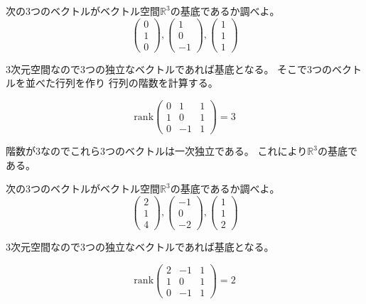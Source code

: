 \documentclass[12pt,b5paper]{ltjsarticle}
\begin{document}
次の3つのベクトルがベクトル空間$\mathbb{R}^3$の基底であるか調べよ。
\begin{equation}
 \begin{pmatrix}0\\1\\0\end{pmatrix},
 \begin{pmatrix}1\\0\\-1\end{pmatrix},
 \begin{pmatrix}1\\1\\1\end{pmatrix}
\end{equation}

\dotfill

3次元空間なので3つの独立なベクトルであれば基底となる。
そこで3つのベクトルを並べた行列を作り
行列の階数を計算する。

\begin{equation}
 \mathrm{rank}
 \begin{pmatrix}0 & 1 & 1\\1 & 0 & 1\\0 & -1 & 1\end{pmatrix}
 = 3
\end{equation}

階数が3なのでこれら3つのベクトルは一次独立である。
これにより$\mathbb{R}^3$の基底である。

\hrulefill

次の3つのベクトルがベクトル空間$\mathbb{R}^3$の基底であるか調べよ。
\begin{equation}
 \begin{pmatrix}2\\1\\4\end{pmatrix},
 \begin{pmatrix}-1\\0\\-2\end{pmatrix},
 \begin{pmatrix}1\\1\\2\end{pmatrix}
\end{equation}

\dotfill

3次元空間なので3つの独立なベクトルであれば基底となる。

\begin{equation}
 \mathrm{rank}
 \begin{pmatrix}2 & -1 & 1\\1 & 0 & 1\\0 & -1 & 1\end{pmatrix}
 = 2
\end{equation}
\end{document}
